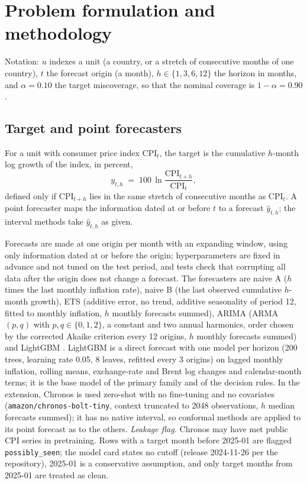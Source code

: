 \section{Problem formulation and methodology}\label{sec:method}

Notation: $u$ indexes a unit (a country, or a stretch of consecutive months of one country), $t$ the forecast origin (a month), $h\in\{1,3,6,12\}$ the horizon in months, and $\alpha=0.10$ the target miscoverage, so that the nominal coverage is $1-\alpha=0.90$.

\subsection{Target and point forecasters}\label{sec:forecasters}

For a unit with consumer price index $\mathrm{CPI}_t$, the target is the cumulative $h$-month log growth of the index, in percent,
\begin{equation}\label{eq:target}
y_{t,h} \;=\; 100\,\ln\!\frac{\mathrm{CPI}_{t+h}}{\mathrm{CPI}_t},
\end{equation}
defined only if $\mathrm{CPI}_{t+h}$ lies in the same stretch of consecutive months as $\mathrm{CPI}_t$. A point forecaster maps the information dated at or before $t$ to a forecast $\hat y_{t,h}$; the interval methods take $\hat y_{t,h}$ as given.

Forecasts are made at one origin per month with an expanding window, using only information dated at or before the origin; hyperparameters are fixed in advance and not tuned on the test period, and tests check that corrupting all data after the origin does not change a forecast. The forecasters are naive A ($h$ times the last monthly inflation rate), naive B (the last observed cumulative $h$-month growth), ETS \citep{hyndman2002ets} (additive error, no trend, additive seasonality of period 12, fitted to monthly inflation, $h$ monthly forecasts summed), ARIMA (ARMA$(p,q)$ with $p,q\in\{0,1,2\}$, a constant and two annual harmonics, order chosen by the corrected Akaike criterion \citep{hurvich1989aicc} every 12 origins, $h$ monthly forecasts summed) and LightGBM \citep{ke2017lightgbm}. LightGBM is a direct forecast with one model per horizon (200 trees, learning rate 0.05, 8 leaves, refitted every 3 origins) on lagged monthly inflation, rolling means, exchange-rate and Brent log changes and calendar-month terms; it is the base model of the primary family and of the decision rules. In the extension, Chronos \citep{ansari2024chronos} is used zero-shot with no fine-tuning and no covariates (\texttt{amazon/chronos-bolt-tiny}, context truncated to 2048 observations, $h$ median forecasts summed); it has no native interval, so conformal methods are applied to its point forecast as to the others. \emph{Leakage flag.} Chronos may have met public CPI series in pretraining. Rows with a target month before 2025-01 are flagged \texttt{possibly\_seen}; the model card \citep{amazon2024chronosbolt} states no cutoff (release 2024-11-26 per the repository), 2025-01 is a conservative assumption, and only target months from 2025-01 are treated as clean.


